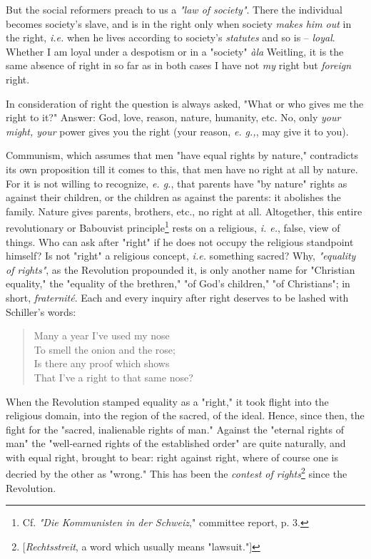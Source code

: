 \documentclass[a4paper]{book}
\begin{document}
But the social reformers preach to us a \textit{"{}law of society"{}}. There 
the individual becomes society's slave, and is in the right only when society 
\textit{makes him out} in the right, \textit{i.e.} when he lives according to 
society's \textit{statutes} and so is -- \textit{loyal}. Whether I am loyal 
under a despotism or in a "{}society"{} \textit{\`ala} Weitling, it is the 
same absence of right in so far as in both cases I have not \textit{my} right 
but \textit{foreign} right.

In consideration of right the question is always asked, "{}What or who gives 
me the right to it?"{} Answer: God, love, reason, nature, humanity, etc. No, 
only \textit{your might, your} power gives you the right (your reason, 
\textit{e. g.,}, may give it to you).

Communism, which assumes that men "{}have equal rights by nature,"{} 
contradicts its own proposition till it comes to this, that men have no right 
at all by nature. For it is not willing to recognize, \textit{e. g.}, that 
parents have "{}by nature"{} rights as against their children, or the children 
as against the parents: it abolishes the family. Nature gives parents, 
brothers, etc., no right at all. Altogether, this entire revolutionary or 
Babouvist principle\footnote{Cf. \textit{"{}Die Kommunisten in der 
Schweiz},"{} committee report, p. 3.} rests on a religious, \textit{i. e.}, 
false, view of things. Who can ask after "{}right"{} if he does not occupy the 
religious standpoint himself? Is not "{}right"{} a religious concept, 
\textit{i.e.} something sacred? Why, \textit{"{}equality of rights"{}}, as the 
Revolution propounded it, is only another name for "{}Christian equality,"{} 
the "{}equality of the brethren,"{} "{}of God's children,"{} "{}of 
Christians"{}; in short, \textit{fraternit\'e}. Each and every inquiry after 
right deserves to be lashed with Schiller's words:

\begin{quotation}

\noindent{} Many a year I've used my nose\\
 To smell the onion and the rose;\\
 Is there any proof which shows\\
 That I've a right to that same nose? \end{quotation}

\noindent{}When the Revolution stamped equality as a "{}right,"{} it took 
flight into the religious domain, into the region of the sacred, of the ideal. 
Hence, since then, the fight for the "{}sacred, inalienable rights of man."{} 
Against the "{}eternal rights of man"{} the "{}well-earned rights of the 
established order"{} are quite naturally, and with equal right, brought to 
bear: right against right, where of course one is decried by the other as 
"{}wrong."{} This has been the \textit{contest of 
rights}\footnote{[\textit{Rechtsstreit}, a word which usually means 
"{}lawsuit."{}]} since the Revolution.
\end{document}
